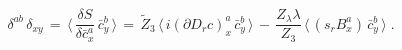 \begin{equation}
  \label{ghDSE1}
   \delta^{ab} \, \delta_{xy}
\,   =\, \langle \, \frac{\delta S}{\delta\bar c^a_x} \, \bar c^b_y\, \rangle
\,   =\,  \widetilde Z_3 \,  \langle  \, i (\partial D_r c)^a_x \, \bar c^b_y\,
  \rangle \,  - \,\frac{Z_\lambda \lambda }{Z_3} \,\langle  \, (s_r B^a_x ) \, \bar
  c^b_y\, \rangle   \; .
\end{equation}

